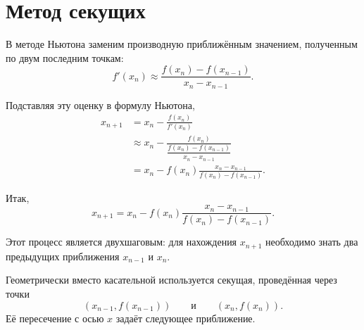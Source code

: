 \documentclass[../final.tex]{subfiles}
\begin{document}
\section{Метод секущих}

В методе Ньютона заменим производную приближённым значением,
полученным по двум последним точкам:
%
\begin{equation*}
    f'(x_n)
    \approx
    \frac{
        f(x_n)-f(x_{n-1})
    }{
        x_n-x_{n-1}
    }.
\end{equation*}

Подставляя эту оценку в формулу Ньютона,
%
\begin{align*}
    x_{n+1}
    &=
    x_n
    -
    \frac{f(x_n)}{f'(x_n)}
    \\
    &\approx
    x_n
    -
    \frac{
        f(x_n)
    }{
        \dfrac{f(x_n)-f(x_{n-1})}{x_n-x_{n-1}}
    }
    \\
    &=
    x_n
    -
    f(x_n)
    \frac{x_n-x_{n-1}}
    {f(x_n)-f(x_{n-1})}.
\end{align*}

Итак,
%
\begin{equation*}
    x_{n+1}
    =
    x_n
    -
    f(x_n)
    \frac{x_n-x_{n-1}}
    {f(x_n)-f(x_{n-1})}.
\end{equation*}

Этот процесс является двухшаговым: для нахождения $x_{n+1}$
необходимо знать два предыдущих приближения $x_{n-1}$ и $x_n$.

Геометрически вместо касательной используется секущая, проведённая
через точки
%
\begin{equation*}
    (x_{n-1},f(x_{n-1}))
    \qquad\text{и}\qquad
    (x_n,f(x_n)).
\end{equation*}
%
Её пересечение с осью $x$ задаёт следующее приближение.
\end{document}

